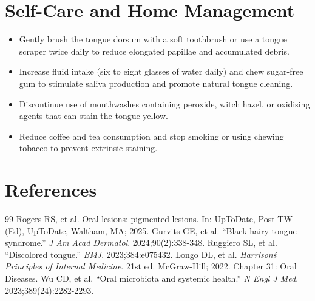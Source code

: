 \section*{Self-Care and Home Management}
\begin{itemize}
  \item Gently brush the tongue dorsum with a soft toothbrush or use a tongue scraper twice daily to reduce elongated papillae and accumulated debris.
  \item Increase fluid intake (six to eight glasses of water daily) and chew sugar-free gum to stimulate saliva production and promote natural tongue cleaning.
  \item Discontinue use of mouthwashes containing peroxide, witch hazel, or oxidising agents that can stain the tongue yellow.
  \item Reduce coffee and tea consumption and stop smoking or using chewing tobacco to prevent extrinsic staining.
\end{itemize}

\section*{References}
\begin{thebibliography}{99}
 Rogers RS, et al. Oral lesions: pigmented lesions. In: UpToDate, Post TW (Ed), UpToDate, Waltham, MA; 2025.
 Gurvits GE, et al. ``Black hairy tongue syndrome.'' \emph{J Am Acad Dermatol}. 2024;90(2):338-348.
 Ruggiero SL, et al. ``Discolored tongue.'' \emph{BMJ}. 2023;384:e075432.
 Longo DL, et al. \emph{Harrison\'s Principles of Internal Medicine}. 21st ed. McGraw-Hill; 2022. Chapter 31: Oral Diseases.
 Wu CD, et al. ``Oral microbiota and systemic health.'' \emph{N Engl J Med}. 2023;389(24):2282-2293.
\end{thebibliography}

